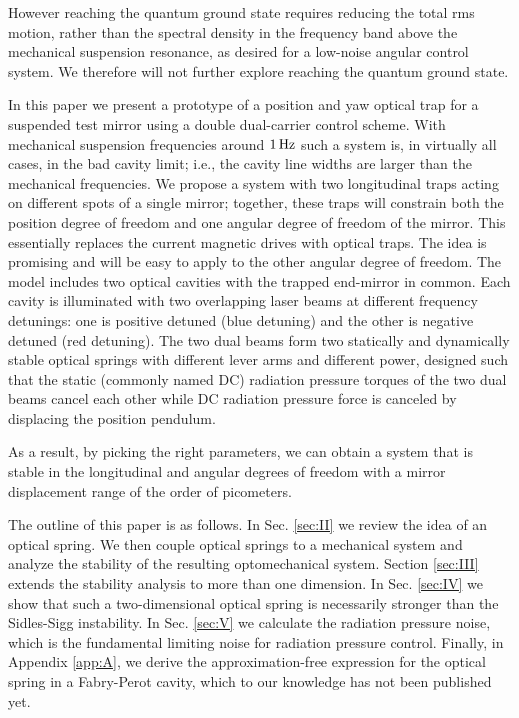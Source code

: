 However reaching the quantum ground state requires reducing the total rms motion, rather than the spectral density in the frequency band above the mechanical suspension resonance, as desired for a low-noise angular control system. We therefore will not further explore reaching the quantum ground state.

In this paper we present
a prototype of a position and yaw optical trap for a suspended test mirror using a double dual-carrier control 
scheme. 
With mechanical suspension frequencies around $1\,{\rm Hz}$ such a system is, in virtually all cases, in the bad cavity limit; i.e., the cavity line widths are larger than the mechanical frequencies.
We propose a system with two longitudinal traps acting on different spots of a single mirror; together, these traps will constrain both the position degree of freedom and one angular degree of freedom of the mirror.
This essentially replaces the current magnetic drives with optical traps.  The idea is promising and will be easy to apply to the other
angular degree of freedom.
The model includes two optical cavities with the trapped end-mirror in common. Each cavity is illuminated with two overlapping laser beams at different frequency detunings: one is positive detuned (blue detuning) and the other is negative detuned (red detuning).
The two dual beams form two statically and dynamically stable optical springs with different lever arms and different power, designed such that the static (commonly named DC) radiation pressure torques of the two dual beams cancel each other while 
DC radiation pressure force is canceled by displacing the position pendulum. 

As a result, by picking the right 
parameters, we can obtain a system that is stable in the longitudinal and angular degrees of freedom with a mirror 
displacement range of the order of picometers.

The outline of this paper is as follows. In Sec. \ref{sec:II} we review the idea of an optical spring. We then couple optical springs to a mechanical system and analyze the stability of the resulting optomechanical system.
Section \ref{sec:III} extends the stability analysis to more than one dimension.
In Sec. \ref{sec:IV} we show that such a two-dimensional optical spring is necessarily stronger than the Sidles-Sigg instability. In Sec. \ref{sec:V} we calculate the radiation pressure noise, which is the fundamental limiting noise for radiation pressure control. Finally, in Appendix \ref{app:A}, we derive the approximation-free expression for the optical spring in a Fabry-Perot cavity, which to our knowledge has not been published yet.


